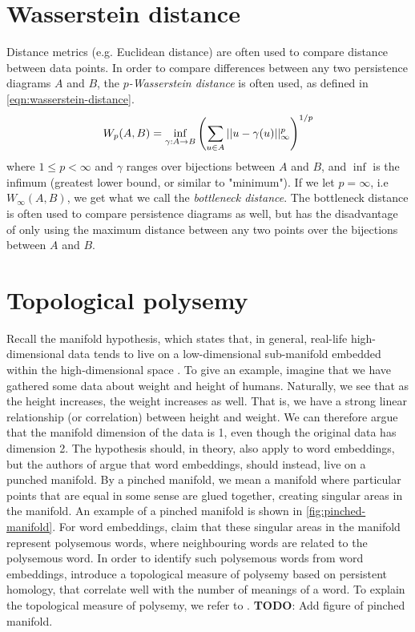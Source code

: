 \section{Wasserstein distance}
Distance metrics (e.g. Euclidean distance) are often used to compare distance between data points. In order to compare differences between any two persistence diagrams $A$ and $B$, the $p$\textit{-Wasserstein distance} is often used, as defined in \cref{eqn:wasserstein-distance}.
\begin{align}
    W_p(A, B) = \inf_{\gamma: A \rightarrow B} \left(\sum\limits_{u \in A}^{} ||u - \gamma(u)||_{\infty}^{p}\right)^{1/p}
    \label{eqn:wasserstein-distance}
\end{align}
where $1 \leq p < \infty$ and $\gamma$ ranges over bijections between $A$ and $B$, and $\inf$ is the infimum (greatest lower bound, or similar to "minimum"). If we let $p=\infty$, i.e $W_\infty(A, B)$, we get what we call the \textit{bottleneck distance}. The bottleneck distance is often used to compare persistence diagrams as well, but has the disadvantage of only using the maximum distance between any two points over the bijections between $A$ and $B$.

\section{Topological polysemy}
\label{sec:topological-polysemy}
Recall the manifold hypothesis, which states that, in general, real-life high-dimensional data tends to live on a low-dimensional sub-manifold embedded within the high-dimensional space \cite[p. 16]{bengio2014representation}. To give an example, imagine that we have gathered some data about weight and height of humans. Naturally, we see that as the height increases, the weight increases as well. That is, we have a strong linear relationship (or correlation) between height and weight. We can therefore argue that the manifold dimension of the data is 1, even though the original data has dimension 2. The hypothesis should, in theory, also apply to word embeddings, but the authors of \cite{jakubowski2020topology} argue that word embeddings, should instead, live on a punched manifold. By a pinched manifold, we mean a manifold where particular points that are equal in some sense are glued together, creating singular areas in the manifold. An example of a pinched manifold is shown in \cref{fig:pinched-manifold}. For word embeddings, \cite{jakubowski2020topology} claim that these singular areas in the manifold represent polysemous words, where neighbouring words are related to the polysemous word. In order to identify such polysemous words from word embeddings, \cite{jakubowski2020topology} introduce a topological measure of polysemy based on persistent homology, that correlate well with the number of meanings of a word. To explain the topological measure of polysemy, we refer to \cite{jakubowski2020topology}.
\textbf{TODO}: Add figure of pinched manifold.

